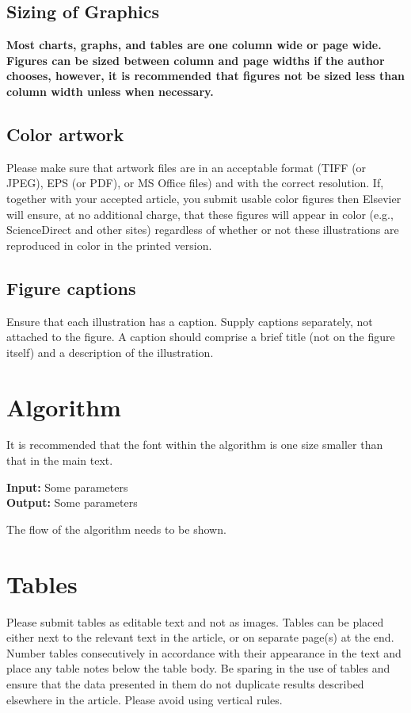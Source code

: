 \documentclass[twocolumn,3p,times,procedia]{elsarticle}
\begin{document}
\subsection{Sizing of Graphics}

\textbf{Most charts, graphs, and tables are one column wide or page wide. Figures can be sized between column and page widths if the author chooses, however, it is recommended that figures not be sized less than column width unless when necessary.}

\subsection{Color artwork}
Please make sure that artwork files are in an acceptable format (TIFF (or JPEG), EPS (or PDF), or MS Office files) and with the correct resolution. If, together with your accepted article, you submit usable color figures then Elsevier will ensure, at no additional charge, that these figures will appear in color (e.g., ScienceDirect and other sites) regardless of whether or not these illustrations are reproduced in color in the printed version.
\subsection{Figure captions}
Ensure that each illustration has a caption. Supply captions separately, not attached to the figure. A caption should comprise a brief title (not on the figure itself) and a description of the illustration.




\section{Algorithm}

It is recommended that the font within the algorithm is one size smaller than that in the main text.

\begin {algorithm}[h] \footnotesize
	\caption{This is an example algorithm}
	\textbf{Input:} Some parameters\\
	\textbf{Output:} Some parameters
	
	\begin{algorithmic}[1]
		\State The flow of the algorithm needs to be shown.	
	\end{algorithmic}
\end{algorithm}

\section{Tables}
Please submit tables as editable text and not as images. Tables can be placed either next to the relevant text in the article, or on separate page(s) at the end. Number tables consecutively in accordance with their appearance in the text and place any table notes below the table body. Be sparing in the use of tables and ensure that the data presented in them do not duplicate results described elsewhere in the article. Please avoid using vertical rules.
\end{document}

